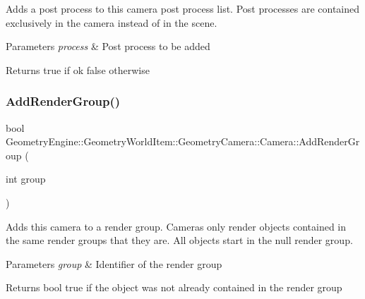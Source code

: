 Adds a post process to this camera post process list. Post processes are contained exclusively in the camera instead of in the scene. 
\begin{DoxyParams}{Parameters}
{\em process} & Post process to be added \\
\hline
\end{DoxyParams}
\begin{DoxyReturn}{Returns}
true if ok false otherwise 
\end{DoxyReturn}
\mbox{\label{class_geometry_engine_1_1_geometry_world_item_1_1_geometry_camera_1_1_camera_a0a76192f4a629a8b6f7a1900078869de}} 
\subsubsection{\texorpdfstring{AddRenderGroup()}{AddRenderGroup()}}
{\footnotesize\ttfamily bool Geometry\+Engine\+::\+Geometry\+World\+Item\+::\+Geometry\+Camera\+::\+Camera\+::\+Add\+Render\+Group (\begin{DoxyParamCaption}\item[{int}]{group }\end{DoxyParamCaption})\hspace{0.3cm}{\ttfamily [virtual]}}

Adds this camera to a render group. Cameras only render objects contained in the same render groups that they are. All objects start in the null render group. 
\begin{DoxyParams}{Parameters}
{\em group} & Identifier of the render group \\
\hline
\end{DoxyParams}
\begin{DoxyReturn}{Returns}
bool true if the object was not already contained in the render group 
\end{DoxyReturn}
\mbox{\label{class_geometry_engine_1_1_geometry_world_item_1_1_geometry_camera_1_1_camera_a53b37943c1929fde7396c66a36fb3c52}} 

